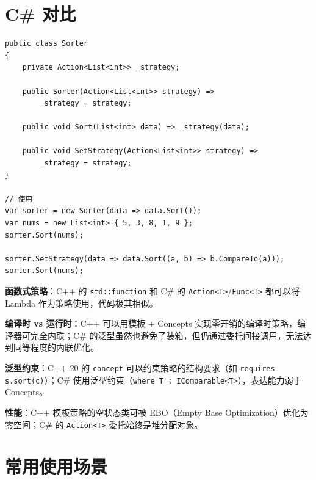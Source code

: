 \documentclass[12pt,a4paper,fontset=fandol]{ctexbook}
\begin{document}
\section{C\# 对比}

\begin{lstlisting}[style=csharpstyle, caption={策略模式 --- C\# 实现}]
public class Sorter
{
    private Action<List<int>> _strategy;

    public Sorter(Action<List<int>> strategy) =>
        _strategy = strategy;

    public void Sort(List<int> data) => _strategy(data);

    public void SetStrategy(Action<List<int>> strategy) =>
        _strategy = strategy;
}

// 使用
var sorter = new Sorter(data => data.Sort());
var nums = new List<int> { 5, 3, 8, 1, 9 };
sorter.Sort(nums);

sorter.SetStrategy(data => data.Sort((a, b) => b.CompareTo(a)));
sorter.Sort(nums);
\end{lstlisting}

\begin{compare}
\textbf{函数式策略}：C++ 的 \texttt{std::function} 和 C\# 的 \texttt{Action<T>}/\allowbreak{}\texttt{Func<T>} 都可以将 Lambda 作为策略使用，代码极其相似。

\textbf{编译时 vs 运行时}：C++ 可以用模板 + Concepts 实现零开销的编译时策略，编译器可完全内联；C\# 的泛型虽然也避免了装箱，但仍通过委托间接调用，无法达到同等程度的内联优化。

\textbf{泛型约束}：C++ 20 的 \texttt{concept} 可以约束策略的结构要求（如 \texttt{requires s.sort(c)}）；C\# 使用泛型约束（\texttt{where T : IComparable<T>}），表达能力弱于 Concepts。

\textbf{性能}：C++ 模板策略的空状态类可被 EBO（Empty Base Optimization）优化为零空间；C\# 的 \texttt{Action<T>} 委托始终是堆分配对象。
\end{compare}

\section{常用使用场景}
\end{document}
